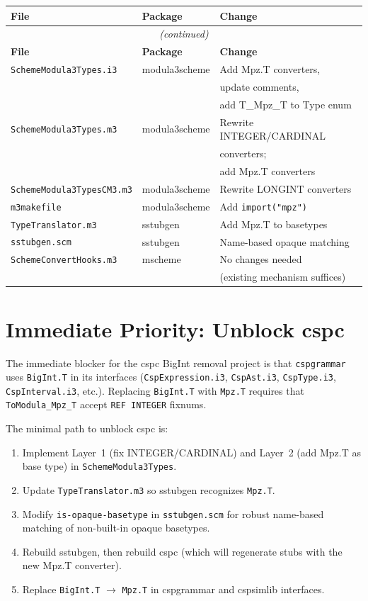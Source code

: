 \documentclass[11pt]{article}
\begin{document}
\begin{center}
\begin{longtable}{lll}
\toprule
\textbf{File} & \textbf{Package} & \textbf{Change} \\
\midrule
\endfirsthead
\multicolumn{3}{c}{\emph{(continued)}} \\
\toprule
\textbf{File} & \textbf{Package} & \textbf{Change} \\
\midrule
\endhead
\texttt{SchemeModula3Types.i3} & modula3scheme & Add Mpz.T converters, \\
 & & update comments, \\
 & & add T\_Mpz\_T to Type enum \\
\texttt{SchemeModula3Types.m3} & modula3scheme & Rewrite INTEGER/CARDINAL \\
 & & converters; \\
 & & add Mpz.T converters \\
\texttt{SchemeModula3TypesCM3.m3} & modula3scheme & Rewrite LONGINT converters \\
\texttt{m3makefile} & modula3scheme & Add \texttt{import("mpz")} \\
\texttt{TypeTranslator.m3} & sstubgen & Add Mpz.T to basetypes \\
\texttt{sstubgen.scm} & sstubgen & Name-based opaque matching \\
\texttt{SchemeConvertHooks.m3} & mscheme & No changes needed \\
 & & (existing mechanism suffices) \\
\bottomrule
\end{longtable}
\end{center}

\section{Immediate Priority: Unblock cspc}

The immediate blocker for the cspc BigInt removal project is that
\texttt{cspgrammar} uses \texttt{BigInt.T} in its interfaces
(\texttt{CspExpression.i3}, \texttt{CspAst.i3}, \texttt{CspType.i3},
\texttt{CspInterval.i3}, etc.).  Replacing \texttt{BigInt.T} with
\texttt{Mpz.T} requires that \texttt{ToModula\_Mpz\_T} accept
\texttt{REF INTEGER} fixnums.

The minimal path to unblock cspc is:
\begin{enumerate}
\item Implement Layer~1 (fix INTEGER/CARDINAL) and Layer~2 (add Mpz.T
  as base type) in \texttt{SchemeModula3Types}.
\item Update \texttt{TypeTranslator.m3} so sstubgen recognizes
  \texttt{Mpz.T}.
\item Modify \texttt{is-opaque-basetype} in \texttt{sstubgen.scm} for
  robust name-based matching of non-built-in opaque basetypes.
\item Rebuild sstubgen, then rebuild cspc (which will regenerate stubs
  with the new Mpz.T converter).
\item Replace \texttt{BigInt.T} $\to$ \texttt{Mpz.T} in cspgrammar and
  cspsimlib interfaces.
\end{enumerate}
\end{document}
